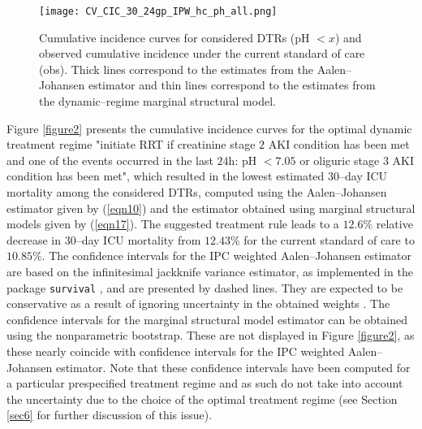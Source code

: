 \documentclass[12pt]{article}
\begin{document}
\begin{figure}[H]
\begin{center}
\texttt{[image: CV\_CIC\_30\_24gp\_IPW\_hc\_ph\_all.png]}
\end{center}
\caption{Cumulative incidence curves for considered DTRs (pH $< x$) and observed cumulative incidence under the current standard of care (obs). Thick lines correspond to the estimates from the Aalen--Johansen estimator and thin lines correspond to the estimates from the dynamic--regime marginal structural model.\label{figure1}}
\end{figure}
\indent
Figure \ref{figure2} presents the cumulative incidence curves for the optimal dynamic treatment regime "initiate RRT if creatinine stage $2$ AKI condition has been met and one of the events occurred in the last $24$h: pH $< 7.05$ or oliguric stage $3$ AKI condition has been met", which resulted in the lowest estimated $30$--day ICU mortality among the considered DTRs, computed using the Aalen--Johansen estimator given by (\ref{eqn10}) and the estimator obtained using marginal structural models given by (\ref{eqn17}). The suggested treatment rule leads to a $12.6 \%$ relative decrease in $30$--day ICU mortality from $12.43 \%$ for the current standard of care to $10.85 \%$. The confidence intervals for the IPC weighted Aalen--Johansen estimator are based on the infinitesimal jackknife variance estimator, as implemented in the package \texttt{survival} \citep{Therneau2020}, and are presented by dashed lines. They are expected to be conservative as a result of ignoring uncertainty in the obtained weights \citep{Rotnitzky2010a}. The confidence intervals for the marginal structural model estimator can be obtained using the nonparametric bootstrap. These are not displayed in Figure \ref{figure2}, as these nearly coincide with confidence intervals for the IPC weighted Aalen--Johansen estimator.  Note that these confidence intervals have been computed for a particular prespecified treatment regime and as such do not take into account the uncertainty due to the choice of the optimal treatment regime (see Section \ref{sec6} for further discussion of this issue).
\\
\indent
\end{document}
